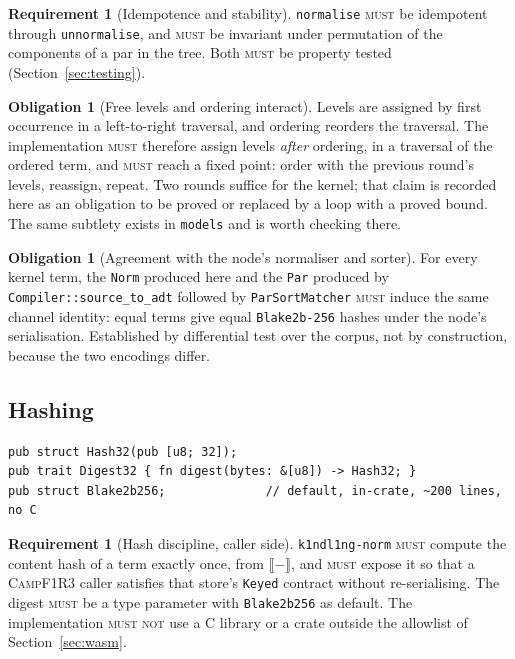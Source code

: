 \documentclass[11pt,a4paper]{article}
\newcommand{\code}[1]{\texttt{#1}}
\newcommand{\Camp}{\textsc{CampF1R3}}
\newcommand{\MUST}{\textsc{must}}
\newcommand{\MUSTNOT}{\textsc{must not}}
\newcommand{\enc}[1]{\llbracket #1 \rrbracket}
\theoremstyle{definition}
\newtheorem{requirement}[definition]{Requirement}
\newtheorem{obligation}[definition]{Obligation}
\theoremstyle{plain}
\begin{document}
\begin{requirement}[Idempotence and stability]
\code{normalise} \MUST{} be idempotent through \code{unnormalise}, and \MUST{}
be invariant under permutation of the components of a par in the tree. Both
\MUST{} be property tested (Section~\ref{sec:testing}).
\end{requirement}

\begin{obligation}[Free levels and ordering interact]\label{obl:levels}
Levels are assigned by first occurrence in a left-to-right traversal, and
ordering reorders the traversal. The implementation \MUST{} therefore assign
levels \emph{after} ordering, in a traversal of the ordered term, and \MUST{}
reach a fixed point: order with the previous round's levels, reassign, repeat.
Two rounds suffice for the kernel; that claim is recorded here as an obligation
to be proved or replaced by a loop with a proved bound. The same subtlety exists
in \code{models} and is worth checking there.
\end{obligation}

\begin{obligation}[Agreement with the node's normaliser and sorter]\label{obl:sortagree}
For every kernel term, the \code{Norm} produced here and the \code{Par} produced
by \code{Compiler::source\_to\_adt} followed by \code{ParSortMatcher} \MUST{}
induce the same channel identity: equal terms give equal \code{Blake2b-256}
hashes under the node's serialisation. Established by differential test over the
corpus, not by construction, because the two encodings differ.
\end{obligation}

\subsection{Hashing}

\begin{lstlisting}
pub struct Hash32(pub [u8; 32]);
pub trait Digest32 { fn digest(bytes: &[u8]) -> Hash32; }
pub struct Blake2b256;              // default, in-crate, ~200 lines, no C
\end{lstlisting}

\begin{requirement}[Hash discipline, caller side]
\code{k1ndl1ng-norm} \MUST{} compute the content hash of a term exactly once,
from $\enc{-}$, and \MUST{} expose it so that a \Camp{} caller satisfies that
store's \code{Keyed} contract without re-serialising. The digest \MUST{} be a
type parameter with \code{Blake2b256} as default. The implementation \MUSTNOT{}
use a C library or a crate outside the allowlist of Section~\ref{sec:wasm}.
\end{requirement}
\end{document}

